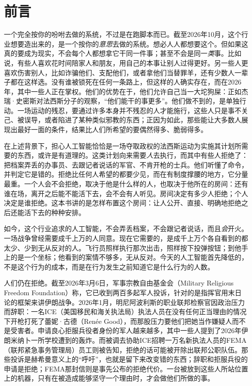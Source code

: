 \chapter*{前言}
一个完全按你的吩咐去做的系统，不过是在跑脚本而已。截至2026年10月，这个行业想要造出来的，是一个按你的\emph{意思}去做的系统。想必人人都想要这个。但如果这真的要成为现实，不会每个人都想拿它干同一件事；甚至不会是同一\emph{类}事。比如说，有些人喜欢花时间陪家人和朋友，用自己的本事让别人过得更好。另一些人更喜欢伤害别人，比如诈骗他们、支配他们，或者拿他们当替罪羊，还有少数人一辈子都在这样选。没有谁被锁死在任何一条路上，但这样的人确实存在，而在2026年，其中一些人正在掌权。他们的优势在于，他们允许自己当一大坨狗屎：正如杰瑞·史密斯对法西斯分子的观察，“他们能干的事更多”\autocite{rickandmorty2023}。他们做不到的，是单独行动。一场运动的残忍，要通过许多本身并不残忍的人才能施行，这些人只是事不关己、被误导，或者陷进了某种类似邪教的东西；正因为如此，那些能让大多数人展现出最好一面的条件，结果比人们所希望的要偶然得多、脆弱得多。

在上述背景下，担心人工智能恰恰是一场夺取政权的法西斯运动为实施其计划所需要的东西，或许是有道理的。这类计划向来需要\emph{人}去执行，而其中有些人拒绝了：把档案弄丢的办事员、去跟记者说话的军官、不肯开枪的士兵。他们听懂了命令，并判定它是错的。拒绝比任何人希望的都要少见，而在有制度撑腰的地方，它分量最重。一个人会不会拒绝，取决于他是什么样的人，也取决于他所在的房间：还有谁在场，离开之后能不能活下去，会不会有人听见。房间决定有多少人拒绝；个人决定是谁拒绝。这本书讲的是怎样布置这个房间：让人公开、直接、明确地拒绝之后还能活下去的种种安排。

如今，这个行业追求的人工智能，不会弄丢档案，不会跟记者说话，而且\emph{会}开火。一场战争曾经需要成千上万的人同意。现在它需要的，是成千上万个各自看到的都太少、少到无从反对的人。飞行员照样执行那次出击，照样按下投弹按钮；到他手上的是一个坐标；他看到的案情不够多，无从反对。今天的人工智能首先降低的，不是这个行为的成本，而是在行为发生之前知道它是什么行为的人数。

人们仍在拒绝。截至2026年3月6日，军事宗教自由基金会（Military Religious Freedom Foundation）称，它已收到两百多起军人投诉，针对的是指挥官用末日论的框架来讲伊朗战争\autocite{Snopes2026MRFF}。2026年1月，明尼阿波利斯的职业联邦检察官因政治压力而辞职：一名ICE（美国移民和海关执法局）执法人员在没有任何正当理由的情况下开枪打死了蕾妮·古德（Renée Good），而那股压力要他们把她当作嫌疑人而不是受害者\autocite{Kaplan2026MinnProsecutors,CBS2026MinnFraudProsecutors,Wikipedia2026ReneeGood}。申请良心拒服兵役者身份的军人越来越多，其中一些人提到了2026年伊朗米纳卜一所学校遭到的轰炸\autocite{Sridhar2026CO}。而被调去协助ICE招聘一万名新执法人员的FEMA（联邦紧急事务管理局）员工则被告知，拒绝的话可能被开除出联邦公职队伍\autocite{Dayen2025FEMAICE,Stanton2026FEMALetter}。那些投诉是赫希曼意义上的“呼吁”，也就是留下来改变错的东西\autocite{hirschman1970exit}；辞职和拒服兵役的申请是拒绝；FEMA那封信则是事先公布的拒绝代价。一台被放到这些人所站位置上的机器，只有在被造成能够坚守一个理由时，才会做他们所做的事。


